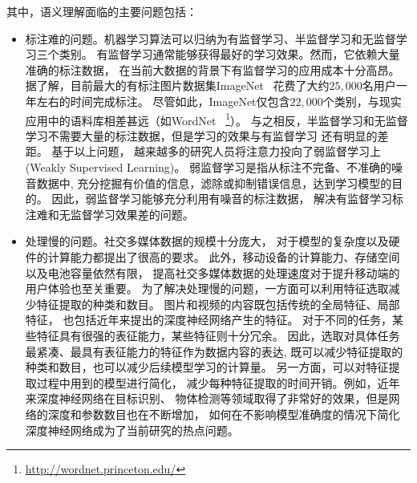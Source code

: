 \documentclass[doctor]{ustcthesis}
\begin{document}
其中，语义理解面临的主要问题包括：
\begin{itemize}
    \item 标注难的问题。机器学习算法可以归纳为有监督学习、半监督学习和无监督学习三个类别。
        有监督学习通常能够获得最好的学习效果。然而，它依赖大量准确的标注数据，
        在当前大数据的背景下有监督学习的应用成本十分高昂。
        据了解，目前最大的有标注图片数据集ImageNet~\cite{russakovsky2015imagenet}
        花费了大约$25,000$名用户一年左右的时间完成标注。
        尽管如此，ImageNet仅包含$22,000$个类别，与现实应用中的语料库相差甚远（如WordNet
        ~\footnote{\url{http://wordnet.princeton.edu/}}）。
        与之相反，半监督学习和无监督学习不需要大量的标注数据，但是学习的效果与有监督学习
        还有明显的差距。 基于以上问题，
        越来越多的研究人员将注意力投向了弱监督学习上(Weakly Supervised Learning)。
        弱监督学习是指从标注不完备、不准确的噪音数据中,
        充分挖掘有价值的信息，滤除或抑制错误信息，达到学习模型的目的。
        因此，弱监督学习能够充分利用有噪音的标注数据，
        解决有监督学习标注难和无监督学习效果差的问题。
    \item 处理慢的问题。社交多媒体数据的规模十分庞大，
        对于模型的复杂度以及硬件的计算能力都提出了很高的要求。
        此外，移动设备的计算能力、存储空间以及电池容量依然有限，
        提高社交多媒体数据的处理速度对于提升移动端的用户体验也至关重要。
        为了解决处理慢的问题，一方面可以利用特征选取减少特征提取的种类和数目。
        图片和视频的内容既包括传统的全局特征、局部特征，
        也包括近年来提出的深度神经网络产生的特征。
        对于不同的任务，某些特征具有很强的表征能力，某些特征则十分冗余。
        因此，选取对具体任务最紧凑、最具有表征能力的特征作为数据内容的表达,
        既可以减少特征提取的种类和数目，也可以减少后续模型学习的计算量。
        另一方面，可以对特征提取过程中用到的模型进行简化，
        减少每种特征提取的时间开销。例如，近年来深度神经网络在目标识别、
        物体检测等领域取得了非常好的效果，但是网络的深度和参数数目也在不断增加，
        如何在不影响模型准确度的情况下简化深度神经网络成为了当前研究的热点问题。
\end{itemize}
\end{document}
